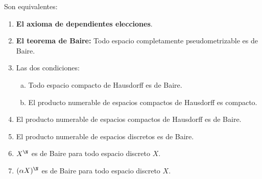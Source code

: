 \documentclass[topologia-analisis.tex]{subfiles}
\begin{document}
\begin{thmi}\label{thm:baire_cat_thm}
	Son equivalentes:
	\begin{enumerate}
		\item \textbf{El axioma de dependientes elecciones}.
		\item \textbf{El teorema de Baire:} Todo espacio completamente pseudometrizable es de Baire.
		\item Las dos condiciones:
			\begin{enumerate}[(a)]
				\item Todo espacio compacto de Hausdorff es de Baire.
				\item El producto numerable de espacios compactos de Hausdorff es compacto.
			\end{enumerate}
		\item El producto numerable de espacios compactos de Hausdorff es de Baire.
		\item El producto numerable de espacios discretos es de Baire.
		\item $X^\N$ es de Baire para todo espacio discreto $X$.
		\item $(\alpha X)^\N$ es de Baire para todo espacio discreto $X$.
	\end{enumerate}
\end{thmi}
\end{document}
